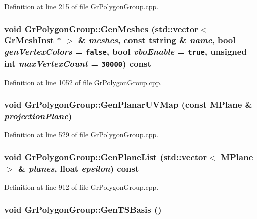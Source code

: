 Definition at line 215 of file GrPolygonGroup.cpp.\hypertarget{class_gr_polygon_group_487e928a1d486489a0e0005cc0eb8669}{
\subsubsection[{GenMeshes}]{\setlength{\rightskip}{0pt plus 5cm}void GrPolygonGroup::GenMeshes (std::vector$<$ {\bf GrMeshInst} $\ast$ $>$ \& {\em meshes}, \/  const {\bf tstring} \& {\em name}, \/  bool {\em genVertexColors} = {\tt false}, \/  bool {\em vboEnable} = {\tt true}, \/  unsigned int {\em maxVertexCount} = {\tt 30000}) const}}
\label{class_gr_polygon_group_487e928a1d486489a0e0005cc0eb8669}




Definition at line 1052 of file GrPolygonGroup.cpp.\hypertarget{class_gr_polygon_group_bd4a96665b406a9694b87f950abc7b10}{
\subsubsection[{GenPlanarUVMap}]{\setlength{\rightskip}{0pt plus 5cm}void GrPolygonGroup::GenPlanarUVMap (const {\bf MPlane} \& {\em projectionPlane})}}
\label{class_gr_polygon_group_bd4a96665b406a9694b87f950abc7b10}




Definition at line 529 of file GrPolygonGroup.cpp.\hypertarget{class_gr_polygon_group_78b2f9321b1e04e636a5ea434326a010}{
\subsubsection[{GenPlaneList}]{\setlength{\rightskip}{0pt plus 5cm}void GrPolygonGroup::GenPlaneList (std::vector$<$ {\bf MPlane} $>$ \& {\em planes}, \/  float {\em epsilon}) const}}
\label{class_gr_polygon_group_78b2f9321b1e04e636a5ea434326a010}




Definition at line 912 of file GrPolygonGroup.cpp.\hypertarget{class_gr_polygon_group_976f3a77c1696b3bc1b0797ad6d4e2ca}{
\subsubsection[{GenTSBasis}]{\setlength{\rightskip}{0pt plus 5cm}void GrPolygonGroup::GenTSBasis ()}}
\label{class_gr_polygon_group_976f3a77c1696b3bc1b0797ad6d4e2ca}




